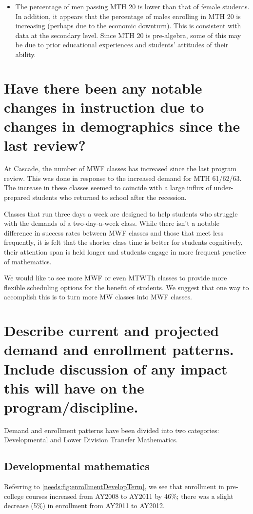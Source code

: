 \begin{itemize}
	\item The percentage of men passing MTH 20 is lower than that of female
	      students.
	      In addition, it appears that the percentage of males enrolling in MTH 20 is increasing (perhaps due to the economic downturn).
	      This is consistent with data at the secondary level.
	      Since MTH 20 is pre-algebra, some of this may be due to prior educational experiences and students' attitudes of their ability.
\end{itemize}

\section[Changes in instruction due to changes in demographics]{Have there been
  any notable changes in instruction due to changes in
  demographics since the last review?}
At Cascade, the number of MWF classes has increased since the last program review.
This was done in response to the increased demand for MTH 61/62/63.
The increase in these classes seemed to coincide with a large influx of under-prepared students who returned to school after the recession.

Classes that run three days a week are designed to help students who struggle with the demands of a two-day-a-week class.
While there isn't a notable difference in success rates between MWF classes and those that meet less frequently, it is felt that the shorter class time is better for students cognitively, their attention span is held longer and students engage in more frequent practice of mathematics.

We would like to see more MWF or even MTWTh classes to provide more flexible scheduling options for the benefit of students.
We suggest that one way to accomplish this is to turn more MW classes into MWF classes.

\section[Demand and enrollment patterns]{Describe current and projected demand
  and enrollment patterns.
  Include discussion of any impact this will have on the program/discipline.
 }
Demand and enrollment patterns have been divided into two categories: Developmental and Lower Division Transfer Mathematics.

\subsection{Developmental mathematics}
Referring to \cref{needs:fig:enrollmentDevelopTerm}, we see that enrollment in pre-college courses increased from AY2008 to AY2011 by 46\%; there was a slight decrease (5\%) in enrollment from AY2011 to AY2012.

